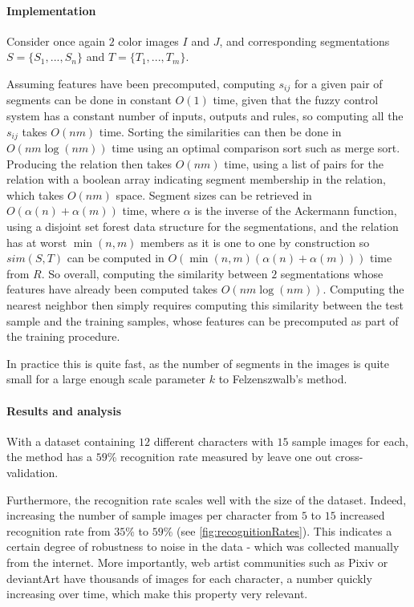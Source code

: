 \paragraph{Implementation}
Consider once again $2$ color images $I$ and $J$, and corresponding segmentations $S = \{S_1, ..., S_n\}$ and $T = \{T_1, ..., T_m\}$.

Assuming features have been precomputed, computing $s_{ij}$ for a given pair of segments can be done in constant $O(1)$ time, given that the fuzzy control system has a constant number of inputs, outputs and rules, so computing all the $s_{ij}$ takes $O(nm)$ time. Sorting the similarities can then be done in $O(nm\log(nm))$ time using an optimal comparison sort such as merge sort. Producing the relation then takes $O(nm)$ time, using a list of pairs for the relation with a boolean array indicating segment membership in the relation, which takes $O(nm)$ space. Segment sizes can be retrieved in $O(\alpha(n) + \alpha(m))$ time, where $\alpha$ is the inverse of the Ackermann function, using a disjoint set forest data structure for the segmentations, and the relation has at worst $\min(n,m)$ members as it is one to one by construction so $sim(S,T)$ can be computed in $O(\min(n,m)(\alpha(n) + \alpha(m)))$ time from $R$. So overall, computing the similarity between $2$ segmentations whose features have already been computed takes $O(nm\log(nm))$. Computing the nearest neighbor then simply requires computing this similarity between the test sample and the training samples, whose features can be precomputed as part of the training procedure.

In practice this is quite fast, as the number of segments in the images is quite small for a large enough scale parameter $k$ to Felzenszwalb's method.

\paragraph{Results and analysis}
With a dataset containing $12$ different characters with $15$ sample images for each, the method has a $59$\% recognition rate measured by leave one out cross-validation.

Furthermore, the recognition rate scales well with the size of the dataset. Indeed, increasing the number of sample images per character from $5$ to $15$ increased recognition rate from $35$\% to $59$\% (see \autoref{fig:recognitionRates}). This indicates a certain degree of robustness to noise in the data - which was collected manually from the internet. More importantly, web artist communities such as Pixiv or deviantArt have thousands of images for each character, a number quickly increasing over time, which make this property very relevant.

